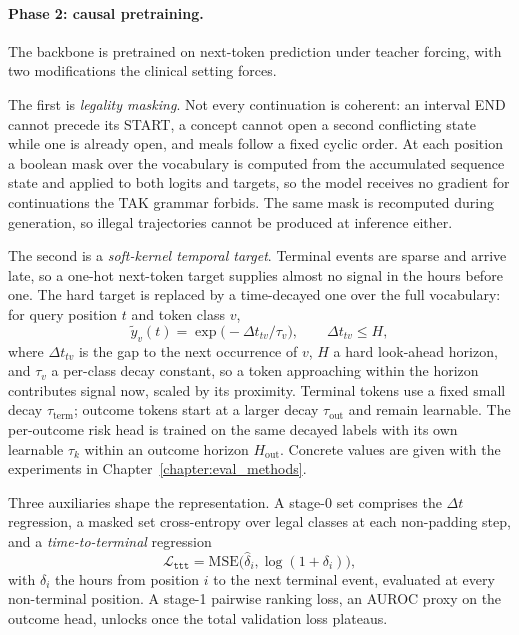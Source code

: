 \paragraph{Phase 2: causal pretraining.}
The backbone is pretrained on next-token prediction under teacher forcing, with two modifications the clinical setting forces.

The first is \emph{legality masking}. Not every continuation is coherent: an interval END cannot precede its START, a concept cannot open a second conflicting state while one is already open, and meals follow a fixed cyclic order. At each position a boolean mask over the vocabulary is computed from the accumulated sequence state and applied to both logits and targets, so the model receives no gradient for continuations the TAK grammar forbids. The same mask is recomputed during generation, so illegal trajectories cannot be produced at inference either.

The second is a \emph{soft-kernel temporal target}. Terminal events are sparse and arrive late, so a one-hot next-token target supplies almost no signal in the hours before one. The hard target is replaced by a time-decayed one over the full vocabulary: for query position $t$ and token class $v$,
\begin{equation}
  \tilde{y}_v(t) = \exp\big(-\Delta t_{tv} / \tau_v\big), \qquad \Delta t_{tv} \le H,
\end{equation}
where $\Delta t_{tv}$ is the gap to the next occurrence of $v$, $H$ a hard look-ahead horizon, and $\tau_v$ a per-class decay constant, so a token approaching within the horizon contributes signal now, scaled by its proximity. Terminal tokens use a fixed small decay $\tau_{\mathrm{term}}$; outcome tokens start at a larger decay $\tau_{\mathrm{out}}$ and remain learnable. The per-outcome risk head is trained on the same decayed labels with its own learnable $\tau_k$ within an outcome horizon $H_{\text{out}}$. Concrete values are given with the experiments in Chapter~\ref{chapter:eval_methods}.

Three auxiliaries shape the representation. A stage-0 set comprises the $\Delta t$ regression, a masked set cross-entropy over legal classes at each non-padding step, and a \emph{time-to-terminal} regression
\begin{equation}
\mathcal{L}_{\texttt{ttt}} = \mathrm{MSE}\big(\hat{\delta}_i, \log(1+\delta_i)\big),
\end{equation}
with $\delta_i$ the hours from position $i$ to the next terminal event, evaluated at every non-terminal position. A stage-1 pairwise ranking loss, an AUROC proxy on the outcome head, unlocks once the total validation loss plateaus.

